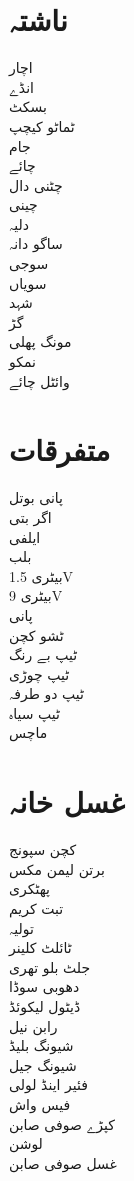 \documentclass[a4paper,11pt]{article}
\begin{document}
\begin{multicols}{6}
\section*{ناشتہ}
اچار \\
انڈے \\
بسکٹ \\
ٹماٹو کیچپ \\
جام \\
چائے \\
چٹنی دال \\
چینی \\
دلیہ \\
ساگو دانہ \\
سوجی \\
سویاں \\
شہد \\
گڑ \\
مونگ پھلی \\
نمکو \\
وائٹل چائے 
 
\section*{متفرقات}
پانی بوتل \\
اگر بتی \\
ایلفی \\
بلب \\
بیٹری 1.5V \\
بیٹری 9V \\
پانی \\
ٹشو کچن \\
ٹیپ بے رنگ \\
ٹیپ چوڑی \\
ٹیپ دو طرفہ \\
ٹیپ سیاہ \\
ماچس
\section*{غسل خانہ}
کچن سپونج \\
برتن لیمن مکس \\
پھٹکری \\
تبت کریم \\
تولیہ \\
ٹائلٹ کلینر \\
جلٹ بلو تھری \\
دھوبی سوڈا \\
ڈیٹول لیکوئڈ \\
رابن نیل \\
شیونگ بلیڈ \\
شیونگ جیل \\
فئیر اینڈ لولی \\
فیس واش \\
کپڑے صوفی صابن \\
لوشن \\
غسل صوفی صابن
 
\end{multicols}
 
\end{document}
